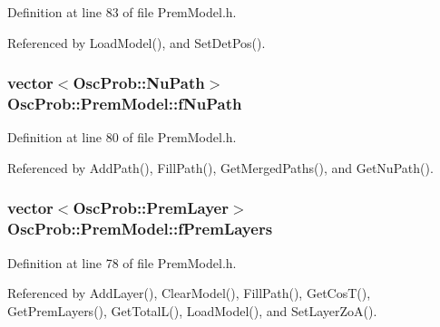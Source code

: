 Definition at line 83 of file Prem\+Model.\+h.



Referenced by Load\+Model(), and Set\+Det\+Pos().

\subsubsection[{\texorpdfstring{f\+Nu\+Path}{fNuPath}}]{\setlength{\rightskip}{0pt plus 5cm}vector$<${\bf Osc\+Prob\+::\+Nu\+Path}$>$ Osc\+Prob\+::\+Prem\+Model\+::f\+Nu\+Path\hspace{0.3cm}{\ttfamily [protected]}}\hypertarget{classOscProb_1_1PremModel_afb5674b8b06add6b981e557d7b07016c}{}\label{classOscProb_1_1PremModel_afb5674b8b06add6b981e557d7b07016c}


Definition at line 80 of file Prem\+Model.\+h.



Referenced by Add\+Path(), Fill\+Path(), Get\+Merged\+Paths(), and Get\+Nu\+Path().

\subsubsection[{\texorpdfstring{f\+Prem\+Layers}{fPremLayers}}]{\setlength{\rightskip}{0pt plus 5cm}vector$<${\bf Osc\+Prob\+::\+Prem\+Layer}$>$ Osc\+Prob\+::\+Prem\+Model\+::f\+Prem\+Layers\hspace{0.3cm}{\ttfamily [protected]}}\hypertarget{classOscProb_1_1PremModel_ac33265ceae42c59a5e11ca416eff93b0}{}\label{classOscProb_1_1PremModel_ac33265ceae42c59a5e11ca416eff93b0}


Definition at line 78 of file Prem\+Model.\+h.



Referenced by Add\+Layer(), Clear\+Model(), Fill\+Path(), Get\+Cos\+T(), Get\+Prem\+Layers(), Get\+Total\+L(), Load\+Model(), and Set\+Layer\+Zo\+A().

